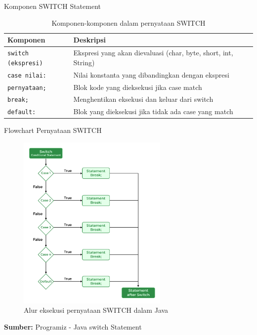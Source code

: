 \documentclass{beamer}
\begin{document}
\begin{frame}{Komponen SWITCH Statement}
  \begin{table}
    \footnotesize
    \begin{tabular}{p{}|p{}}
    \textbf{Komponen} & \textbf{Deskripsi} \\
    \hline
    \rowcolor{lightgray}
    \texttt{switch (ekspresi)} & Ekspresi yang akan dievaluasi (char, byte, short, int, String) \\
    \rowcolor{white}
    \texttt{case nilai:} & Nilai konstanta yang dibandingkan dengan ekspresi \\
    \rowcolor{lightgray}
    \texttt{pernyataan;} & Blok kode yang dieksekusi jika case match \\
    \rowcolor{white}
    \texttt{break;} & Menghentikan eksekusi dan keluar dari switch \\
    \rowcolor{lightgray}
    \texttt{default:} & Blok yang dieksekusi jika tidak ada case yang match \\
    \end{tabular}
    \caption{Komponen-komponen dalam pernyataan SWITCH}
  \end{table}
\end{frame}

\begin{frame}[fragile]{Flowchart Pernyataan SWITCH}
  \begin{figure}[h]
    \centering
    \includegraphics[width=0.65\textwidth]{Struktur Kontrol 2/switch-flowchart.png}
    \caption{Alur eksekusi pernyataan SWITCH dalam Java}
    \label{fig:switch-flowchart}
  \end{figure}
  \textbf{Sumber: }Programiz - Java switch Statement
\end{frame}
\end{document}
